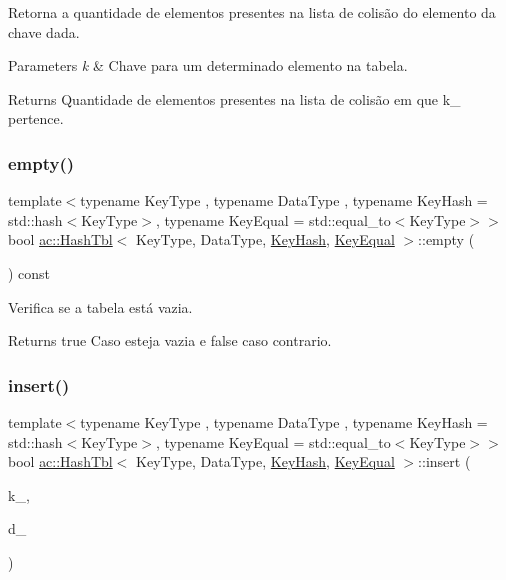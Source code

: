 Retorna a quantidade de elementos presentes na lista de colisão do elemento da chave dada. 
\begin{DoxyParams}{Parameters}
{\em k} & Chave para um determinado elemento na tabela. \\
\hline
\end{DoxyParams}
\begin{DoxyReturn}{Returns}
Quantidade de elementos presentes na lista de colisão em que k\+\_\+ pertence. 
\end{DoxyReturn}
\mbox{\label{classac_1_1_hash_tbl_a980e0609d4838c8afb7fa63a94ab6f7e}} 
\subsubsection{\texorpdfstring{empty()}{empty()}}
{\footnotesize\ttfamily template$<$typename Key\+Type , typename Data\+Type , typename Key\+Hash  = std\+::hash$<$\+Key\+Type$>$, typename Key\+Equal  = std\+::equal\+\_\+to$<$\+Key\+Type$>$$>$ \\
bool \hyperlink{classac_1_1_hash_tbl}{ac\+::\+Hash\+Tbl}$<$ Key\+Type, Data\+Type, \hyperlink{struct_key_hash}{Key\+Hash}, \hyperlink{struct_key_equal}{Key\+Equal} $>$\+::empty (\begin{DoxyParamCaption}\item[{void}]{ }\end{DoxyParamCaption}) const\hspace{0.3cm}{\ttfamily [inline]}}

Verifica se a tabela está vazia. \begin{DoxyReturn}{Returns}
true Caso esteja vazia e false caso contrario. 
\end{DoxyReturn}
\mbox{\label{classac_1_1_hash_tbl_a219a559a1a07170cc0679c5d1dfb3758}} 
\subsubsection{\texorpdfstring{insert()}{insert()}}
{\footnotesize\ttfamily template$<$typename Key\+Type , typename Data\+Type , typename Key\+Hash  = std\+::hash$<$\+Key\+Type$>$, typename Key\+Equal  = std\+::equal\+\_\+to$<$\+Key\+Type$>$$>$ \\
bool \hyperlink{classac_1_1_hash_tbl}{ac\+::\+Hash\+Tbl}$<$ Key\+Type, Data\+Type, \hyperlink{struct_key_hash}{Key\+Hash}, \hyperlink{struct_key_equal}{Key\+Equal} $>$\+::insert (\begin{DoxyParamCaption}\item[{const Key\+Type \&}]{k\+\_\+,  }\item[{const Data\+Type \&}]{d\+\_\+ }\end{DoxyParamCaption})\hspace{0.3cm}{\ttfamily [inline]}}

